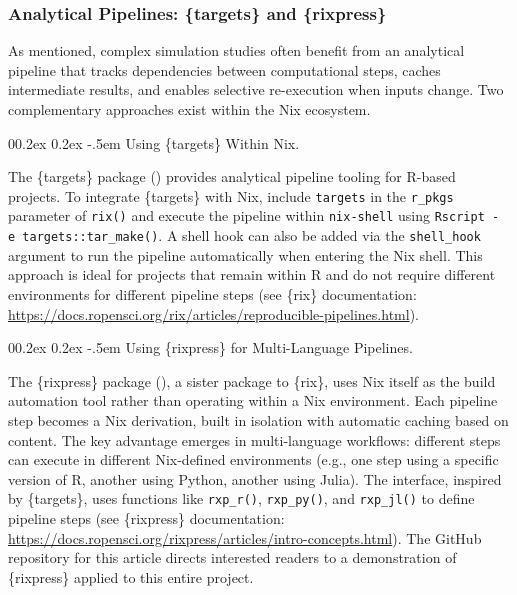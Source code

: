 \documentclass[
  man,
  longtable,
  nolmodern,
  notxfonts,
  notimes,
  colorlinks=true,linkcolor=blue,citecolor=blue,urlcolor=blue]{apa7}
\makeatletter
\renewcommand{\paragraph}{\@startsection{paragraph}{4}{\parindent}%
	{0\baselineskip \@plus 0.2ex \@minus 0.2ex}%
	{-.5em}%
	{\normalfont\normalsize\bfseries\typesectitle}}
\makeatother
\begin{document}
\subsubsection{Analytical Pipelines: \{targets\} and
\{rixpress\}}\label{analytical-pipelines-targets-and-rixpress}

As mentioned, complex simulation studies often benefit from an
analytical pipeline that tracks dependencies between computational
steps, caches intermediate results, and enables selective re-execution
when inputs change. Two complementary approaches exist within the Nix
ecosystem.

\paragraph{Using \{targets\} Within
Nix.}\label{using-targets-within-nix}

The \{targets\} package ()
provides analytical pipeline tooling for R-based projects. To integrate
\{targets\} with Nix, include \texttt{targets} in the \texttt{r\_pkgs}
parameter of \texttt{rix()} and execute the pipeline within
\texttt{nix-shell} using
\texttt{Rscript\ -e\ \textquotesingle{}targets::tar\_make()\textquotesingle{}}.
A shell hook can also be added via the \texttt{shell\_hook} argument to
run the pipeline automatically when entering the Nix shell. This
approach is ideal for projects that remain within R and do not require
different environments for different pipeline steps (see \{rix\}
documentation:
\url{https://docs.ropensci.org/rix/articles/reproducible-pipelines.html}).

\paragraph{Using \{rixpress\} for Multi-Language
Pipelines.}\label{using-rixpress-for-multi-language-pipelines}

The \{rixpress\} package (), a
sister package to \{rix\}, uses Nix itself as the build automation tool
rather than operating within a Nix environment. Each pipeline step
becomes a Nix derivation, built in isolation with automatic caching
based on content. The key advantage emerges in multi-language workflows:
different steps can execute in different Nix-defined environments (e.g.,
one step using a specific version of R, another using Python, another
using Julia). The interface, inspired by \{targets\}, uses functions
like \texttt{rxp\_r()}, \texttt{rxp\_py()}, and \texttt{rxp\_jl()} to
define pipeline steps (see \{rixpress\} documentation:
\url{https://docs.ropensci.org/rixpress/articles/intro-concepts.html}).
The GitHub repository for this article directs interested readers to a
demonstration of \{rixpress\} applied to this entire project.
\end{document}
